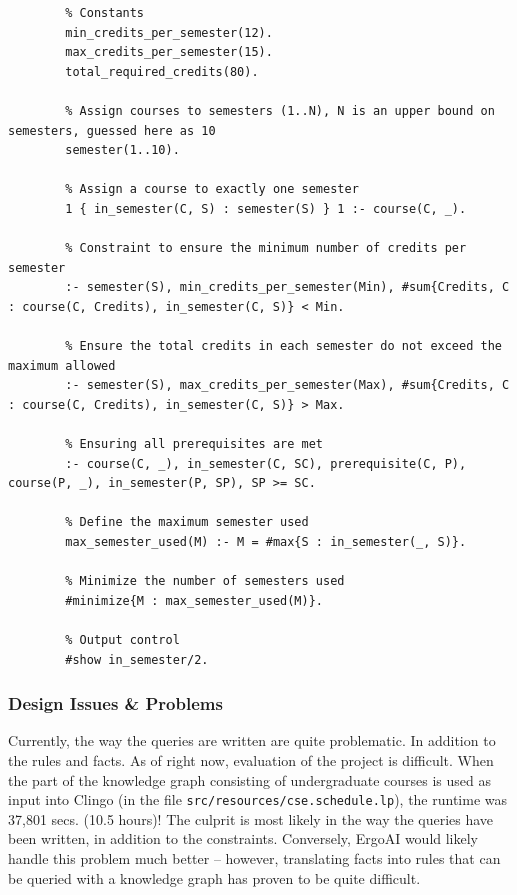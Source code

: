 \documentclass[12pt]{article}
\begin{document}
    \begin{lstlisting}
        % Constants
        min_credits_per_semester(12).
        max_credits_per_semester(15).
        total_required_credits(80).
        
        % Assign courses to semesters (1..N), N is an upper bound on semesters, guessed here as 10
        semester(1..10).
        
        % Assign a course to exactly one semester
        1 { in_semester(C, S) : semester(S) } 1 :- course(C, _).
        
        % Constraint to ensure the minimum number of credits per semester
        :- semester(S), min_credits_per_semester(Min), #sum{Credits, C : course(C, Credits), in_semester(C, S)} < Min.
        
        % Ensure the total credits in each semester do not exceed the maximum allowed
        :- semester(S), max_credits_per_semester(Max), #sum{Credits, C : course(C, Credits), in_semester(C, S)} > Max.
        
        % Ensuring all prerequisites are met
        :- course(C, _), in_semester(C, SC), prerequisite(C, P), course(P, _), in_semester(P, SP), SP >= SC.
        
        % Define the maximum semester used
        max_semester_used(M) :- M = #max{S : in_semester(_, S)}.
        
        % Minimize the number of semesters used
        #minimize{M : max_semester_used(M)}.
        
        % Output control
        #show in_semester/2.
    \end{lstlisting}


    \subsubsection{Design Issues \& Problems}
    \label{subsubsec:des-iss-probs}

    Currently, the way the queries are written are quite problematic. In addition to the rules and facts. As of right now, evaluation of the project is difficult. When the part of the knowledge graph consisting of undergraduate courses is used as input into Clingo (in the file {\tt{src/resources/cse.schedule.lp}}), the runtime was 37,801 secs. (10.5 hours)! The culprit is most likely in the way the queries have been written, in addition to the constraints. Conversely, ErgoAI would likely handle this problem much better -- however, translating facts into rules that can be queried with a knowledge graph has proven to be quite difficult.
\end{document}
